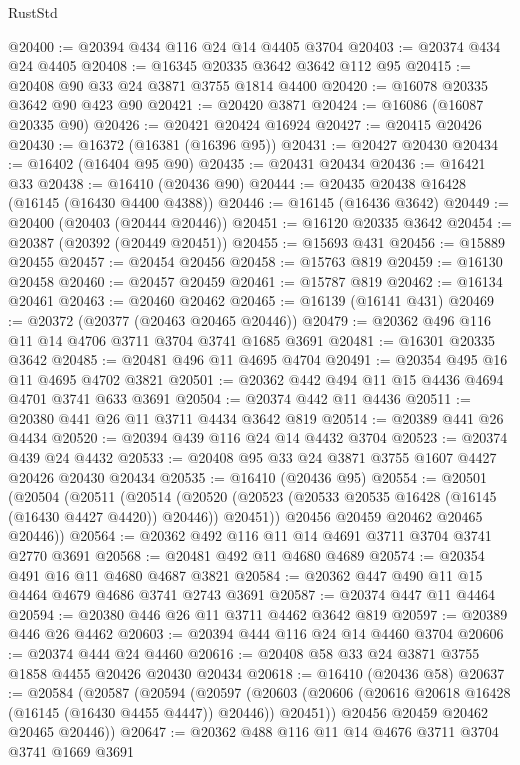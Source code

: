 \begin{lexlean}{RustStd}
\begin{coremodule}
@20400 := @20394 @434 @116 @24 @14 @4405 @3704
@20403 := @20374 @434 @24 @4405
@20408 := @16345 @20335 @3642 @3642 @112 @95
@20415 := @20408 @90 @33 @24 @3871 @3755 @1814 @4400
@20420 := @16078 @20335 @3642 @90 @423 @90
@20421 := @20420 @3871
@20424 := @16086 (@16087 @20335 @90)
@20426 := @20421 @20424 @16924
@20427 := @20415 @20426
@20430 := @16372 (@16381 (@16396 @95))
@20431 := @20427 @20430
@20434 := @16402 (@16404 @95 @90)
@20435 := @20431 @20434
@20436 := @16421 @33
@20438 := @16410 (@20436 @90)
@20444 := @20435 @20438 @16428 (@16145 (@16430 @4400 @4388))
@20446 := @16145 (@16436 @3642)
@20449 := @20400 (@20403 (@20444 @20446))
@20451 := @16120 @20335 @3642
@20454 := @20387 (@20392 (@20449 @20451))
@20455 := @15693 @431
@20456 := @15889 @20455
@20457 := @20454 @20456
@20458 := @15763 @819
@20459 := @16130 @20458
@20460 := @20457 @20459
@20461 := @15787 @819
@20462 := @16134 @20461
@20463 := @20460 @20462
@20465 := @16139 (@16141 @431)
@20469 := @20372 (@20377 (@20463 @20465 @20446))
@20479 := @20362 @496 @116 @11 @14 @4706 @3711 @3704 @3741 @1685 @3691
@20481 := @16301 @20335 @3642
@20485 := @20481 @496 @11 @4695 @4704
@20491 := @20354 @495 @16 @11 @4695 @4702 @3821
@20501 := @20362 @442 @494 @11 @15 @4436 @4694 @4701 @3741 @633 @3691
@20504 := @20374 @442 @11 @4436
@20511 := @20380 @441 @26 @11 @3711 @4434 @3642 @819
@20514 := @20389 @441 @26 @4434
@20520 := @20394 @439 @116 @24 @14 @4432 @3704
@20523 := @20374 @439 @24 @4432
@20533 := @20408 @95 @33 @24 @3871 @3755 @1607 @4427 @20426 @20430 @20434
@20535 := @16410 (@20436 @95)
@20554 := @20501
    (@20504
      (@20511
        (@20514
          (@20520 (@20523 (@20533 @20535 @16428 (@16145 (@16430 @4427 @4420)) @20446)) @20451))
        @20456
        @20459
        @20462
        @20465
        @20446))
@20564 := @20362 @492 @116 @11 @14 @4691 @3711 @3704 @3741 @2770 @3691
@20568 := @20481 @492 @11 @4680 @4689
@20574 := @20354 @491 @16 @11 @4680 @4687 @3821
@20584 := @20362 @447 @490 @11 @15 @4464 @4679 @4686 @3741 @2743 @3691
@20587 := @20374 @447 @11 @4464
@20594 := @20380 @446 @26 @11 @3711 @4462 @3642 @819
@20597 := @20389 @446 @26 @4462
@20603 := @20394 @444 @116 @24 @14 @4460 @3704
@20606 := @20374 @444 @24 @4460
@20616 := @20408 @58 @33 @24 @3871 @3755 @1858 @4455 @20426 @20430 @20434
@20618 := @16410 (@20436 @58)
@20637 := @20584
    (@20587
      (@20594
        (@20597
          (@20603 (@20606 (@20616 @20618 @16428 (@16145 (@16430 @4455 @4447)) @20446)) @20451))
        @20456
        @20459
        @20462
        @20465
        @20446))
@20647 := @20362 @488 @116 @11 @14 @4676 @3711 @3704 @3741 @1669 @3691

\end{coremodule}
\end{lexlean}
